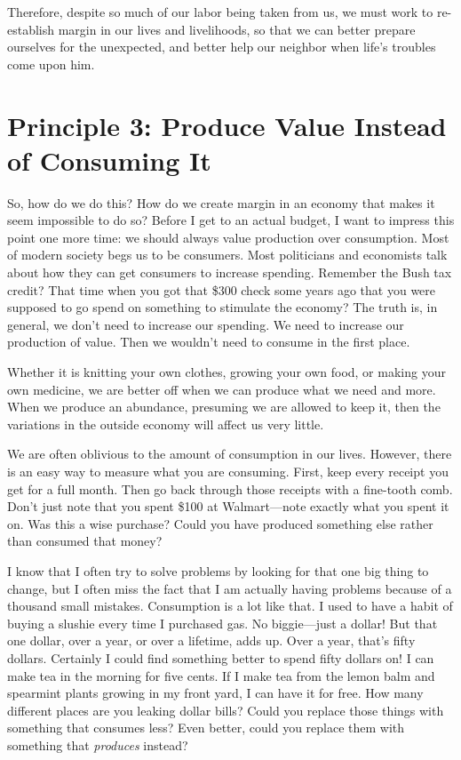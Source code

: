 Therefore, despite so much of our labor being taken from us, we must
work to re-establish margin in our lives and livelihoods, so that we
can better prepare ourselves for the unexpected, and better help our
neighbor when life's troubles come upon him.

\section{Principle 3: Produce Value Instead of Consuming It}

So, how do we do this?
How do we create margin in an economy that makes it seem impossible to
do so? Before I get to an actual budget, I want to impress this point
one more time: we should always value production over consumption.
Most of modern society
begs us to be
consumers. Most politicians and economists talk about how they can get
consumers to increase spending.
Remember the Bush tax
credit?  That time when you got that \$300 check some years ago that
you were supposed to go spend on something to stimulate the economy?
 The truth is, in
general, we don't need to increase our spending. We
need to increase our production of value. Then we
wouldn't need to consume in the first place.

Whether it is knitting your own clothes, growing your own food, or
making your own medicine, we are better off when we can produce what we
need and more. When we produce an abundance, presuming we are allowed
to keep it, then the variations in the outside economy will affect us
very little. 

We are often oblivious to the amount of consumption in our lives.
However, there is an easy way to measure what you are consuming. First,
keep every receipt you get for a full month. Then go back through those
receipts with a fine-tooth comb. Don't just note that
you spent \$100 at Walmart—note exactly what you spent it on. Was this
a wise purchase? Could you have produced something else rather than
consumed that money?  

I know that I often try to solve problems by looking for that one big
thing to change, but I often miss the fact that I am actually having
problems because of a thousand small mistakes. Consumption is a lot
like that. I used to have a habit of buying a slushie every time I
purchased gas. No biggie—just a dollar!  But that one dollar, over a
year, or over a lifetime, adds up. Over a year, that's
fifty dollars. Certainly I could find something better to spend fifty
dollars on!  I can make tea in the morning for five cents. If I make
tea from the lemon balm and spearmint plants growing in my front yard,
I can have it for free. How many different places are you leaking
dollar bills?  Could
you replace those
things with something that consumes less?  Even better, could you
replace them with
something that \textit{produces} instead?

